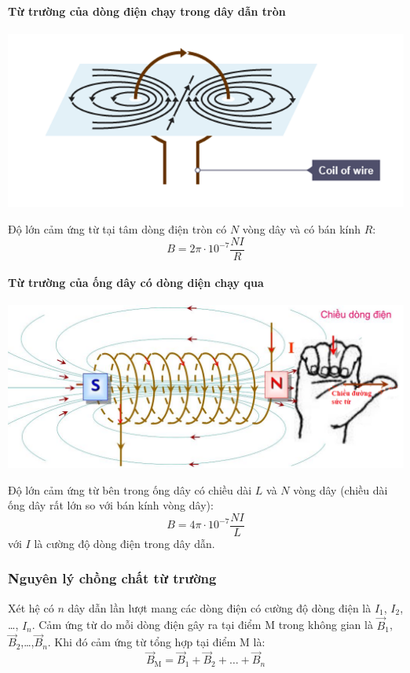 \begin{tomtat}
	\paragraph{Từ trường của dòng điện chạy trong dây dẫn tròn}
	\begin{center}
		\includegraphics[width=0.6\linewidth]{figs/VN12-Y24-PH-SYL-019-1}
	\end{center}
	Độ lớn cảm ứng từ tại tâm dòng điện tròn có $N$ vòng dây và có bán kính $R$:
	\begin{equation}
		B=2\pi\cdot10^{-7}\dfrac{NI}{R}
	\end{equation}
	\paragraph{Từ trường của ống dây có dòng diện chạy qua}
	\begin{center}
		\includegraphics[width=0.6\linewidth]{figs/VN12-Y24-PH-SYL-019-2}
	\end{center}
	Độ lớn cảm ứng từ bên trong ống dây có chiều dài $L$ và $N$ vòng dây (chiều dài ống dây rất lớn so với bán kính vòng dây):
	\begin{equation}
		B=4\pi \cdot10^{-7}\dfrac{NI}{L}
	\end{equation}
	với $I$ là cường độ dòng điện trong dây dẫn.
	\subsubsection{Nguyên lý chồng chất từ trường}
	Xét hệ có $n$ dây dẫn lần lượt mang các dòng điện có cường độ dòng điện là $I_1$, $I_2$, \dots, $I_n$. Cảm ứng từ do mỗi dòng điện gây ra tại điểm M trong không gian là $\vec{B}_1$, $\vec{B}_2$,\dots,$\vec{B}_n$. Khi đó cảm ứng từ tổng hợp tại điểm M là:
	\begin{equation}
		\vec{B}_\text{M}=\vec{B}_1+\vec{B}_2+\dots+\vec{B}_n
	\end{equation}
\end{tomtat}

